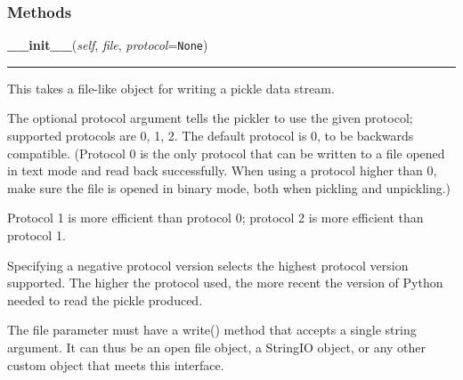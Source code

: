   \subsubsection{Methods}

    \label{pickle:Pickler:__init__}

    \vspace{0.5ex}

\hspace{.8\funcindent}\begin{boxedminipage}{\funcwidth}

    \raggedright \textbf{\_\_init\_\_}(\textit{self}, \textit{file}, \textit{protocol}={\tt None})

    \vspace{-1.5ex}

    \rule{\textwidth}{0.5\fboxrule}
\setlength{\parskip}{2ex}
    This takes a file-like object for writing a pickle data stream.

    The optional protocol argument tells the pickler to use the given 
    protocol; supported protocols are 0, 1, 2.  The default protocol is 0, 
    to be backwards compatible.  (Protocol 0 is the only protocol that can 
    be written to a file opened in text mode and read back successfully.  
    When using a protocol higher than 0, make sure the file is opened in 
    binary mode, both when pickling and unpickling.)

    Protocol 1 is more efficient than protocol 0; protocol 2 is more 
    efficient than protocol 1.

    Specifying a negative protocol version selects the highest protocol 
    version supported.  The higher the protocol used, the more recent the 
    version of Python needed to read the pickle produced.

    The file parameter must have a write() method that accepts a single 
    string argument.  It can thus be an open file object, a StringIO 
    object, or any other custom object that meets this interface.

\setlength{\parskip}{1ex}
    \end{boxedminipage}

    \label{pickle:Pickler:clear_memo}

    \vspace{0.5ex}

